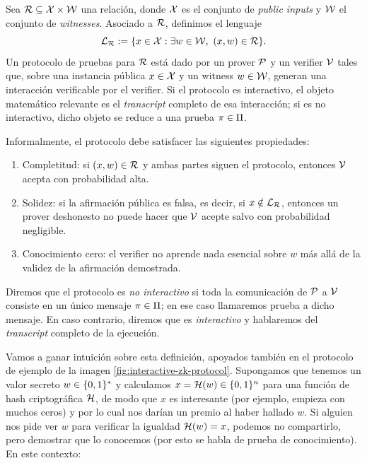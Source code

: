 \begin{definition}
\label{def:apendice-b-introduccion-protocolo-de-pruebas-zk}
	Sea $\mathcal{R} \subseteq \mathcal{X} \times \mathcal{W}$ una relación, donde $\mathcal{X}$ es el conjunto de \textit{public inputs} y $\mathcal{W}$ el conjunto de \textit{witnesses}. Asociado a $\mathcal{R}$, definimos el lenguaje
	$$\mathcal{L}_{\mathcal{R}} := \{x \in \mathcal{X} : \exists w \in \mathcal{W},\ (x,w) \in \mathcal{R}\}.$$
	Un protocolo de pruebas \ZK para $\mathcal{R}$ está dado por un prover $\mathcal{P}$ y un verifier $\mathcal{V}$ tales que, sobre una instancia pública $x \in \mathcal{X}$ y un witness $w \in \mathcal{W}$, generan una interacción verificable por el verifier. Si el protocolo es interactivo, el objeto matemático relevante es el \textit{transcript} completo de esa interacción; si es no interactivo, dicho objeto se reduce a una prueba $\pi \in \Pi$.

	Informalmente, el protocolo debe satisfacer las siguientes propiedades:
	\begin{enumerate}[noitemsep]
		\item Completitud: si $(x,w) \in \mathcal{R}$ y ambas partes siguen el protocolo, entonces $\mathcal{V}$ acepta con probabilidad alta.
		\item Solidez: si la afirmación pública es falsa, es decir, si $x \notin \mathcal{L}_{\mathcal{R}}$, entonces un prover deshonesto no puede hacer que $\mathcal{V}$ acepte salvo con probabilidad negligible.
		\item Conocimiento cero: el verifier no aprende nada esencial sobre $w$ más allá de la validez de la afirmación demostrada.
	\end{enumerate}

	Diremos que el protocolo es \textit{no interactivo} si toda la comunicación de $\mathcal{P}$ a $\mathcal{V}$ consiste en un único mensaje $\pi \in \Pi$; en ese caso llamaremos prueba a dicho mensaje. En caso contrario, diremos que es \textit{interactivo} y hablaremos del \textit{transcript} completo de la ejecución.
\end{definition}

Vamos a ganar intuición sobre esta definición, apoyados también en el protocolo de ejemplo de la imagen \ref{fig:interactive-zk-protocol}. Supongamos que tenemos un valor secreto $w \in \{0,1\}^{*}$ y calculamos $x = \mathcal{H}(w) \in \{0,1\}^{n}$ para una función de hash criptográfica $\mathcal{H}$, de modo que $x$ es interesante (por ejemplo, empieza con muchos ceros) y por lo cual nos darían un premio al haber hallado $w$. Si alguien nos pide ver $w$ para verificar la igualdad $\mathcal{H}(w) = x$, podemos no compartirlo, pero demostrar que lo conocemos (por esto se habla de prueba de conocimiento). En este contexto:

